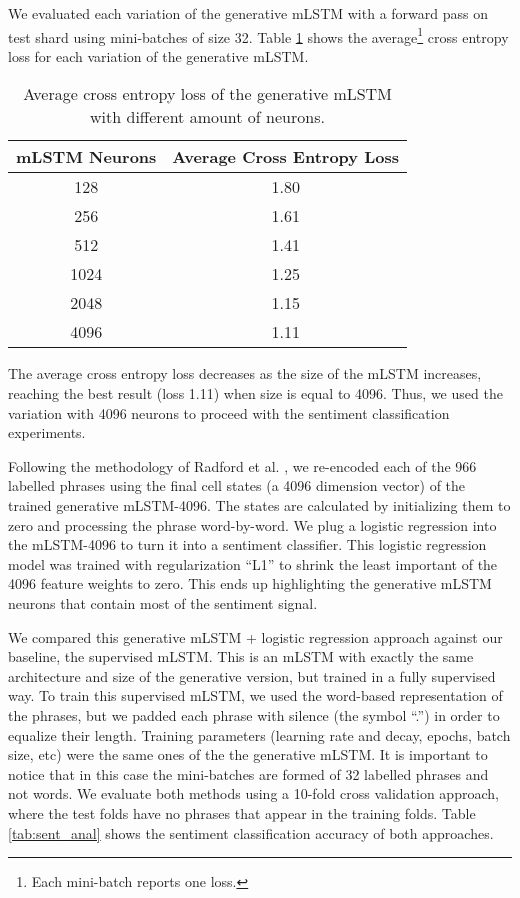 We evaluated each variation of the generative mLSTM with a
forward pass on
test shard using mini-batches of size 32. Table
\ref{tab:gen_anal} shows the average\footnote{Each mini-batch
reports one loss.} cross entropy loss
for each variation of the generative mLSTM.

\begin{table}[!h]
 \begin{center}
 \begin{tabular}{cc}
  \hline
  \textbf{mLSTM Neurons} & \textbf{Average Cross Entropy Loss}\\ \hline
  128 & 1.80   \\
  256  & 1.61  \\
  512  & 1.41  \\
  1024 & 1.25  \\
  2048 & 1.15  \\
  4096 & 1.11  \\ \hline
 \end{tabular}
\end{center}
\caption{Average cross entropy loss of the generative mLSTM with different amount of neurons.}
 \label{tab:gen_anal}
\end{table}

The average cross entropy loss decreases as the size of the mLSTM increases, reaching the best result (loss 1.11) when size is equal to 4096. Thus, we used the variation with 4096 neurons to proceed with the sentiment classification experiments.

Following the methodology of Radford et al. \cite{radford_2017}, we re-encoded
each of the 966 labelled phrases using the final cell states (a 4096 dimension vector)
of the trained generative mLSTM-4096. The states are calculated by initializing them to zero
and processing the phrase word-by-word. We plug a logistic regression into the mLSTM-4096
to turn it into a sentiment classifier. This logistic regression model was trained with
regularization ``L1'' to shrink the least important of the 4096 feature weights to zero.
This ends up highlighting the generative mLSTM neurons that contain most of the sentiment
signal.

We compared this generative mLSTM + logistic regression approach against
our baseline, the supervised mLSTM. This is an mLSTM with exactly the same architecture
and size of the generative version, but trained in a fully supervised way.
To train this supervised mLSTM, we used the word-based representation of the phrases, but we
padded each phrase with silence (the symbol ``.'') in order to equalize their length.
Training parameters (learning rate and decay, epochs, batch size, etc) were the same ones
of the the generative mLSTM. It is important to notice that in this case the mini-batches are
formed of 32 labelled phrases and not words. We evaluate both methods using a 10-fold cross
validation approach, where the test folds have no phrases that appear in the training folds.
Table \ref{tab:sent_anal} shows the sentiment classification accuracy of both approaches.

